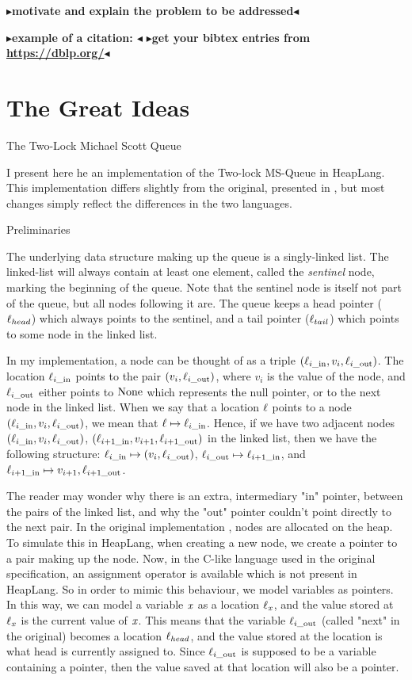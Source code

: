 \documentclass[twoside,11pt,openright]{report}
\newcommand{\locin}[1]{\loc_{#1\_\text{in}}}
\newcommand{\locout}[1]{\loc_{#1\_\text{out}}}
\newcommand{\todo}[1]{{\color[rgb]{.5,0,0}\textbf{$\blacktriangleright$#1$\blacktriangleleft$}}}
\begin{document}
\todo{motivate and explain the problem to be addressed}

\todo{example of a citation: \cite{DBLP:conf/podc/MichaelS96}}
\todo{get your bibtex entries from \url{https://dblp.org/}}


\chapter{The Great Ideas}
\label{ch:main}

The Two-Lock Michael Scott Queue

I present here he an implementation of the Two-lock MS-Queue in HeapLang. This implementation differs slightly from the original, presented in \cite{DBLP:conf/podc/MichaelS96}, but most changes simply reflect the differences in the two languages.


Preliminaries

The underlying data structure making up the queue is a singly-linked list. The linked-list will always contain at least one element, called the \emph{sentinel} node, marking the beginning of the queue. Note that the sentinel node is itself not part of the queue, but all nodes following it are. The queue keeps a head pointer ($\ell_{head}$) which always points to the sentinel, and a tail pointer ($\ell_{tail}$) which points to some node in the linked list.

In my implementation, a node can be thought of as a triple $(\locin{i}, v_i, \locout{i})$. The location $\locin{i}$ points to the pair $(v_i, \locout{i})$, where $v_i$ is the value of the node, and $\locout{i}$ either points to $\operatorname{None}$ which represents the null pointer, or to the next node in the linked list. When we say that a location $\ell$ points to a node $(\locin{i}, v_i, \locout{i})$, we mean that $\loc \mapsto \locin{i}$. Hence, if we have two adjacent nodes $(\locin{i}, v_i, \locout{i})$, $(\locin{i+1}, v_{i+1}, \locout{i+1})$ in the linked list, then we have the following structure: $\locin{i} \mapsto (v_i, \locout{i})$, $\locout{i} \mapsto \locin{i+1}$, and $\locin{i+1} \mapsto v_{i+1}, \locout{i+1}$.

The reader may wonder why there is an extra, intermediary "in" pointer, between the pairs of the linked list, and why the "out" pointer couldn't point directly to the next pair. In the original implementation \cite{DBLP:conf/podc/MichaelS96}, nodes are allocated on the heap. To simulate this in HeapLang, when creating a new node, we create a pointer to a pair making up the node. Now, in the C-like language used in the original specification, an assignment operator is available which is not present in HeapLang. So in order to mimic this behaviour, we model variables as pointers. In this way, we can model a variable $\mathit{x}$ as a location $\ell_{\mathit{x}}$, and the value stored at $\ell_{\mathit{x}}$ is the current value of $\mathit{x}$. This means that the variable $\locout{i}$ (called "next" in the original) becomes a location $\ell_{head}$, and the value stored at the location is what head is currently assigned to. Since $\locout{i}$ is supposed to be a variable containing a pointer, then the value saved at that location will also be a pointer.
\end{document}
